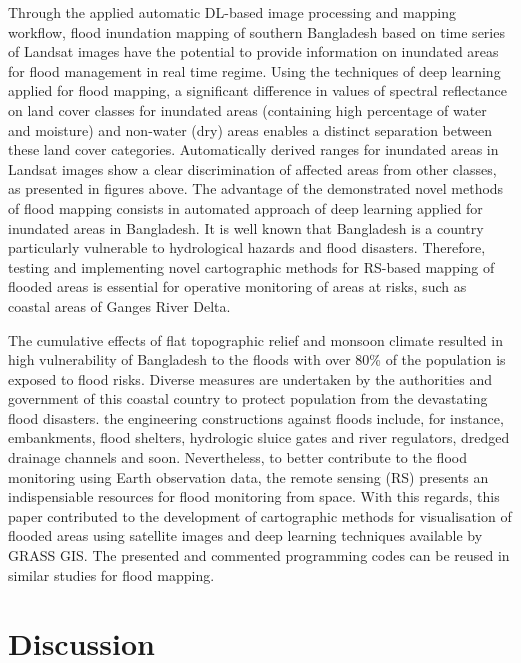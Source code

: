 \documentclass[water,article,submit,pdftex,moreauthors]{Definitions/mdpi}
\begin{document}
Through the applied automatic DL-based image processing and mapping workflow, flood inundation mapping of southern Bangladesh based on time series of Landsat images have the potential to provide information on inundated areas for flood management in real time regime. Using the techniques of deep learning applied for flood mapping, a significant difference in values of spectral reflectance on land cover classes for inundated areas (containing high percentage of water and moisture) and non-water (dry) areas enables a distinct separation between these land cover categories. Automatically derived ranges for inundated areas in Landsat images show a clear discrimination of affected areas from other classes, as presented in figures above. The advantage of the demonstrated novel methods of flood mapping consists in automated approach of deep learning applied for inundated areas in Bangladesh. It is well known that Bangladesh is a country particularly vulnerable to hydrological hazards and flood disasters. Therefore, testing and implementing novel cartographic methods for RS-based mapping of flooded areas is essential for operative monitoring of areas at risks, such as coastal areas of Ganges River Delta. 

The cumulative effects of flat topographic relief and monsoon climate resulted in high vulnerability of Bangladesh to the floods with over 80\% of the population is exposed to flood risks. Diverse measures are undertaken by the authorities and government of this coastal country to protect population from the devastating flood disasters. the engineering constructions against floods include, for instance, embankments, flood shelters, hydrologic sluice gates and river regulators, dredged drainage channels and soon. Nevertheless, to better contribute to the flood monitoring using Earth observation data, the remote sensing (RS) presents an indispensiable resources for flood monitoring from space. With this regards, this paper contributed to the development of cartographic methods for visualisation of flooded areas using satellite images and deep learning techniques available by GRASS GIS. The presented and commented programming codes can be reused in similar studies for flood mapping.
 
\section{Discussion}
\end{document}
